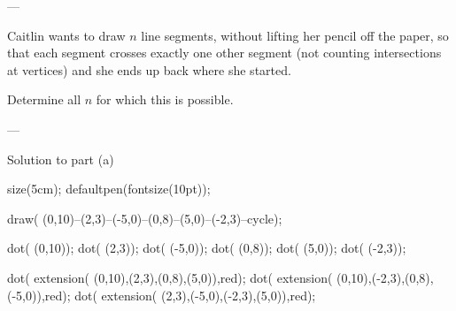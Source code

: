 
---

Caitlin wants to draw $n$ line segments, without lifting her pencil off the paper, so that each segment crosses exactly one other segment (not counting intersections at vertices) and she ends up back where she started.

Determine all $n$ for which this is possible.

---

\begin{customenv}{Solution to part (a)}\
    \begin{center}
        \begin{asy}
            size(5cm); defaultpen(fontsize(10pt));

            draw( (0,10)--(2,3)--(-5,0)--(0,8)--(5,0)--(-2,3)--cycle);

            dot( (0,10));
            dot( (2,3));
            dot( (-5,0));
            dot( (0,8));
            dot( (5,0));
            dot( (-2,3));

            dot( extension( (0,10),(2,3),(0,8),(5,0)),red);
            dot( extension( (0,10),(-2,3),(0,8),(-5,0)),red);
            dot( extension( (2,3),(-5,0),(-2,3),(5,0)),red);
        \end{asy}
    \end{center}
\end{customenv}
